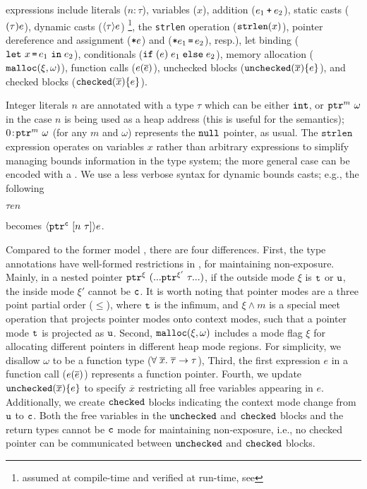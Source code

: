 \lang expressions include literals ($n\!:\!\tau$), variables ($x$),
 addition ($e_1 \mathbin{\texttt{+}} e_2$), static casts ($\mathtt{(}{\tau}\mathtt{)}{e}$), 
dynamic casts ($\langle{\tau}\rangle{e}$) \footnote{assumed at compile-time and verified at run-time, see },
the \texttt{strlen} operation ($\mathtt{strlen}({x})$),
pointer dereference and assignment ($\texttt{*}{e}$)
and ($\texttt{*}{e_1}\,\texttt{=}\, {e_2}$), resp.),
let binding ($\mathtt{let}~x\, \texttt{=}\, e_1~\mathtt{in}\;{e_2}$),
conditionals ($\mathtt{if\;}(e)\;{e_1}\;\mathtt{else}\;{e_2}$),
memory allocation ($\mathtt{malloc}({\xi},{\omega})$), 
function calls (${e}({\overline{e}})$),
unchecked blocks ($\mathtt{unchecked}({\overline{x}})\{e\}$), and checked blocks ($\mathtt{checked}({\overline{x}}){\{e\}}$).

Integer literals $n$ are annotated with a type $\tau$ which can be either
$\mathtt{int}$, or $\mathtt{ptr}^{m}~{\omega}$ in the case $n$ is being used as 
a heap address (this is useful for the semantics);
${0}\!:\!{\mathtt{ptr}^{m}~{\omega}}$ (for any $m$ and $\omega$) represents the $\mathtt{null}$ pointer, as usual. 
The $\texttt{strlen}$ expression operates on variables $x$
rather than arbitrary expressions to simplify managing
bounds information in the type system; the more general case can be
encoded with a . We use a less verbose syntax for dynamic bounds
casts; e.g., the following %

$\tau$\code{>>(}$e$$n$\code{))}

\noindent
becomes $\langle{\ensuremath{\mathtt{ptr}^{\texttt{c}}~{[{n}~{\tau}]}}}\rangle{e}$. 

Compared to the former \checkedc model \cite{li22checkedc},
there are four differences.
First, the \systemname type annotations have well-formed restrictions in , 
for maintaining non-exposure.
Mainly, in a nested pointer $\mathtt{ptr}^{\xi}~{(... \mathtt{ptr}^{\xi'}~{\tau} ...)}$, if the outside mode $\xi$ is 
$\texttt{t}$ or $\texttt{u}$, the inside mode $\xi'$ cannot be $\texttt{c}$.
It is worth noting that pointer modes are a three point partial order ($\le$),
where $\texttt{t}$ is the infimum, and
$\xi\wedge m$ is a special meet operation that projects pointer modes onto context modes,
such that a pointer mode $\texttt{t}$ is projected as $\texttt{u}$.
Second, $\mathtt{malloc}({\xi},{\omega})$ includes a mode flag
$\xi$ for allocating different pointers in different heap mode regions.
For simplicity, we disallow $\omega$ to be a function type ($\forall \;\overline{x}.\;{\overline{\tau}}\to\tau$),
Third, the first expression $e$ in a function call (${e}({\overline{e}})$) represents a function pointer.
Fourth, we update $\mathtt{unchecked}({\overline{x}})\{e\}$ 
to specify $\overline{x}$ restricting all free variables appearing in $e$.
Additionally, we create $\mathtt{checked}$ blocks indicating the context mode change from $\texttt{u}$ to $\texttt{c}$.
Both the free variables in the $\mathtt{unchecked}$ and $\mathtt{checked}$ blocks
and the return types cannot be $\texttt{c}$ mode for maintaining non-exposure,
i.e., no checked pointer can be communicated between $\mathtt{unchecked}$ and $\mathtt{checked}$ blocks.

